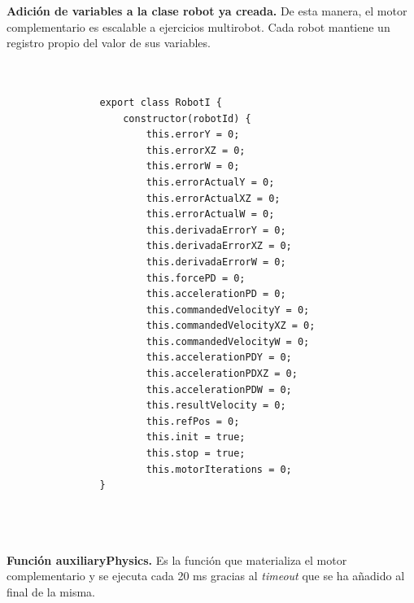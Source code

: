 \textbf{Adición de variables a la clase robot ya creada.} De esta manera, el motor complementario es escalable a ejercicios multirobot. Cada robot mantiene un registro propio del valor de sus variables.
\small {
\begin{verbatim}


                export class RobotI {
                    constructor(robotId) {
                        this.errorY = 0;
                        this.errorXZ = 0;
                        this.errorW = 0;
                        this.errorActualY = 0;
                        this.errorActualXZ = 0;
                        this.errorActualW = 0;
                        this.derivadaErrorY = 0;
                        this.derivadaErrorXZ = 0;
                        this.derivadaErrorW = 0;
                        this.forcePD = 0;
                        this.accelerationPD = 0;
                        this.commandedVelocityY = 0;
                        this.commandedVelocityXZ = 0;
                        this.commandedVelocityW = 0;
                        this.accelerationPDY = 0;
                        this.accelerationPDXZ = 0;
                        this.accelerationPDW = 0;
                        this.resultVelocity = 0;
                        this.refPos = 0;
                        this.init = true;
                        this.stop = true;
                        this.motorIterations = 0;
                }
                
                
                
\end{verbatim}
}

\normalsize
\textbf{Función auxiliaryPhysics.} Es la función que materializa el motor complementario y se ejecuta cada 20 ms gracias al \textit{timeout} que se ha añadido al final de la misma.

